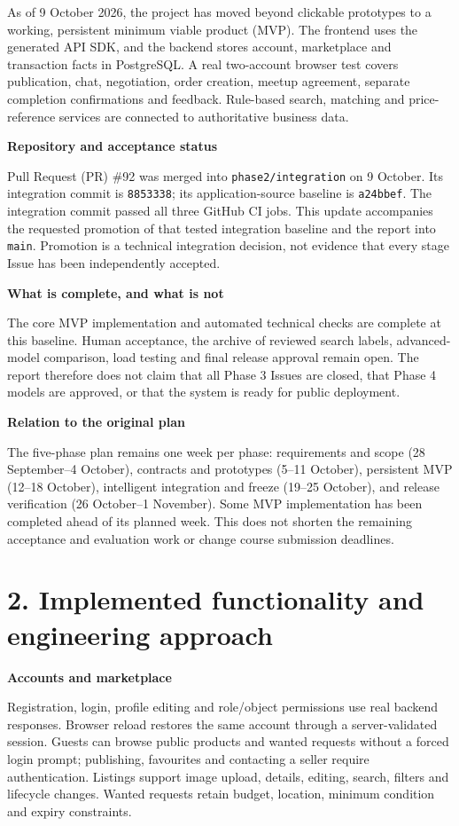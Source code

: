 \documentclass[12pt,a4paper]{article}
\newcommand{\heading}[1]{\vspace{6pt}\textbf{#1}\par}
\begin{document}
As of 9 October 2026, the project has moved beyond clickable prototypes to a working, persistent minimum viable product (MVP). The frontend uses the generated API SDK, and the backend stores account, marketplace and transaction facts in PostgreSQL. A real two-account browser test covers publication, chat, negotiation, order creation, meetup agreement, separate completion confirmations and feedback. Rule-based search, matching and price-reference services are connected to authoritative business data.

\heading{Repository and acceptance status}
Pull Request (PR) \#92 was merged into \texttt{phase2/integration} on 9 October. Its integration commit is \texttt{8853338}; its application-source baseline is \texttt{a24bbef}. The integration commit passed all three GitHub CI jobs. This update accompanies the requested promotion of that tested integration baseline and the report into \texttt{main}. Promotion is a technical integration decision, not evidence that every stage Issue has been independently accepted.

\heading{What is complete, and what is not}
The core MVP implementation and automated technical checks are complete at this baseline. Human acceptance, the archive of reviewed search labels, advanced-model comparison, load testing and final release approval remain open. The report therefore does not claim that all Phase 3 Issues are closed, that Phase 4 models are approved, or that the system is ready for public deployment.

\heading{Relation to the original plan}
The five-phase plan remains one week per phase: requirements and scope (28 September--4 October), contracts and prototypes (5--11 October), persistent MVP (12--18 October), intelligent integration and freeze (19--25 October), and release verification (26 October--1 November). Some MVP implementation has been completed ahead of its planned week. This does not shorten the remaining acceptance and evaluation work or change course submission deadlines.

\clearpage
\section*{2. Implemented functionality and engineering approach}
\heading{Accounts and marketplace}
Registration, login, profile editing and role/object permissions use real backend responses. Browser reload restores the same account through a server-validated session. Guests can browse public products and wanted requests without a forced login prompt; publishing, favourites and contacting a seller require authentication. Listings support image upload, details, editing, search, filters and lifecycle changes. Wanted requests retain budget, location, minimum condition and expiry constraints.
\end{document}
